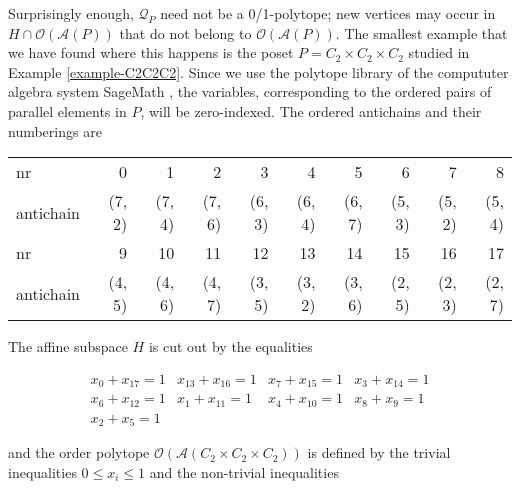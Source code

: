 \documentclass[11pt,a4paper,abstract=yes]{scrartcl}
\theoremstyle{plain}
\newcommand{\prpolytope}[1]{\mathcal{Q}_{#1}}
\newcommand{\orderpolytope}[1]{\mathcal{O}({#1})}
\newcommand{\twoanti}[1]{\mathcal{A}({#1})}
\begin{document}
\begin{mexample}
Surprisingly enough, \(\prpolytope{P}\) need not be a 0/1-polytope; new vertices may
occur in \(H \cap \orderpolytope{\twoanti{P}}\) that do not belong to \(\orderpolytope{\twoanti{P}}\).
The smallest example that we have found where this happens is the
poset \(P=C_{2} \times C_{2} \times C_{2}\) studied in Example \ref{example-C2C2C2}.
Since we use the polytope library of the compututer algebra system SageMath \autocite{sagemath},
the variables, corresponding to the ordered pairs of parallel elements in \(P\), will be zero-indexed.
The ordered antichains and their numberings are
\label{}
\begin{center}
\begin{tabular}{lrrrrrrrrr}
nr & 0 & 1 & 2 & 3 & 4 & 5 & 6 & 7 & 8\\
antichain & (7, 2) & (7, 4) & (7, 6) & (6, 3) & (6, 4) & (6, 7) & (5, 3) & (5, 2) & (5, 4)\\
nr & 9 & 10 & 11 & 12 & 13 & 14 & 15 & 16 & 17\\
antichain & (4, 5) & (4, 6) & (4, 7) & (3, 5) & (3, 2) & (3, 6) & (2, 5) & (2, 3) & (2, 7)\\
\end{tabular}
\end{center}

The affine subspace \(H\) is cut out by the equalities

\label{}
\begin{displaymath}\begin{array}{ccccc}
x_{0} + x_{17} = 1
 &
x_{13} + x_{16} = 1
 &
x_{7} + x_{15} = 1
 &
x_{3} + x_{14} = 1
 \\
x_{6} + x_{12} = 1
 &
x_{1} + x_{11} = 1
 &
x_{4} + x_{10} = 1
 &
x_{8} + x_{9} = 1
 \\
x_{2} + x_{5} = 1
 &
\end{array}\end{displaymath}

and the order polytope \(\orderpolytope{\twoanti{C_{2} \times C_{2} \times C_{2}}}\) is defined by
the trivial inequalities \(0 \le x_i \le 1\) and the non-trivial inequalities


\end{mexample}
\end{document}
